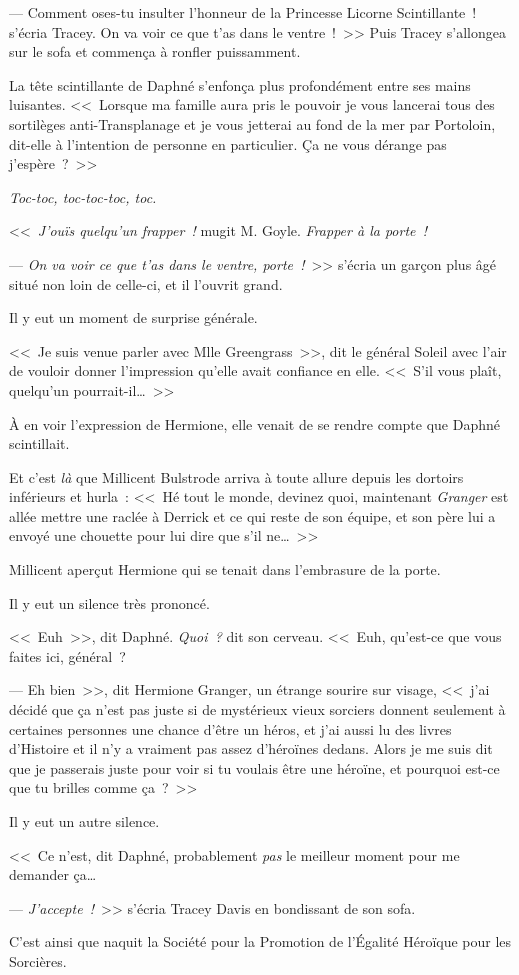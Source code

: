 --- Comment oses-tu insulter l'honneur de la Princesse Licorne Scintillante~! s'écria Tracey. On va voir ce que t'as dans le ventre~!~>> Puis Tracey s'allongea sur le sofa et commença à ronfler puissamment.

La tête scintillante de Daphné s'enfonça plus profondément entre ses mains luisantes. <<~Lorsque ma famille aura pris le pouvoir je vous lancerai tous des sortilèges anti-Transplanage et je vous jetterai au fond de la mer par Portoloin, dit-elle à l'intention de personne en particulier. Ça ne vous dérange pas j'espère~?~>>

\emph{Toc-toc, toc-toc-toc, toc.}

<<~\emph{J'ouïs quelqu'un frapper~!} mugit M. Goyle. \emph{Frapper à la porte~!}

--- \emph{On va voir ce que t'as dans le ventre, porte~!}~>> s'écria un garçon plus âgé situé non loin de celle-ci, et il l'ouvrit grand.

Il y eut un moment de surprise générale.

<<~Je suis venue parler avec Mlle Greengrass~>>, dit le général Soleil avec l'air de vouloir donner l'impression qu'elle avait confiance en elle. <<~S'il vous plaît, quelqu'un pourrait-il…~>>

À en voir l'expression de Hermione, elle venait de se rendre compte que Daphné scintillait.

Et c'est \emph{là} que Millicent Bulstrode arriva à toute allure depuis les dortoirs inférieurs et hurla~: <<~Hé tout le monde, devinez quoi, maintenant \emph{Granger} est allée mettre une raclée à Derrick et ce qui reste de son équipe, et son père lui a envoyé une chouette pour lui dire que s'il ne…~>>

Millicent aperçut Hermione qui se tenait dans l'embrasure de la porte.

Il y eut un silence très prononcé.

<<~Euh~>>, dit Daphné. \emph{Quoi~?} dit son cerveau. <<~Euh, qu'est-ce que vous faites ici, général~?

--- Eh bien~>>, dit Hermione Granger, un étrange sourire sur visage, <<~j'ai décidé que ça n'est pas juste si de mystérieux vieux sorciers donnent seulement à certaines personnes une chance d'être un héros, et j'ai aussi lu des livres d'Histoire et il n'y a vraiment pas assez d'héroïnes dedans. Alors je me suis dit que je passerais juste pour voir si tu voulais être une héroïne, et pourquoi est-ce que tu brilles comme ça~?~>>

Il y eut un autre silence.

<<~Ce n'est, dit Daphné, probablement \emph{pas} le meilleur moment pour me demander ça…

--- \emph{J'accepte~!}~>> s'écria Tracey Davis en bondissant de son sofa.

\later

C'est ainsi que naquit la Société pour la Promotion de l'Égalité Héroïque pour les Sorcières.

